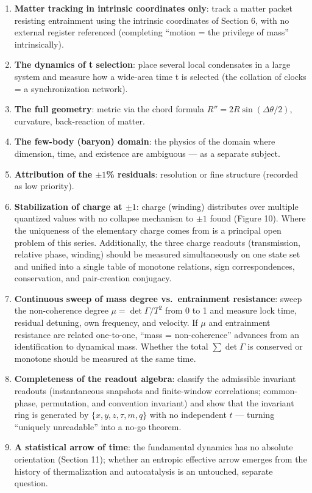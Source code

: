 \documentclass[
  a4paper,
]{article}
\providecommand{\tightlist}{%
  \setlength{\itemsep}{0pt}\setlength{\parskip}{0pt}}
\begin{document}
\begin{enumerate}
\def\labelenumi{\arabic{enumi}.}
\tightlist
\item
  \textbf{Matter tracking in intrinsic coordinates only}: track a matter
  packet resisting entrainment using the intrinsic coordinates of
  Section 6, with no external register referenced (completing ``motion =
  the privilege of mass'' intrinsically).
\item
  \textbf{The dynamics of t selection}: place several local condensates
  in a large system and measure how a wide-area time t is selected (the
  collation of clocks = a synchronization network).
\item
  \textbf{The full geometry}: metric via the chord formula
  \(R''=2R\sin(\Delta\theta/2)\), curvature, back-reaction of matter.
\item
  \textbf{The few-body (baryon) domain}: the physics of the domain where
  dimension, time, and existence are ambiguous --- as a separate
  subject.
\item
  \textbf{Attribution of the \(\pm 1\)\% residuals}: resolution or fine
  structure (recorded as low priority).
\item
  \textbf{Stabilization of charge at \(\pm 1\)}: charge (winding)
  distributes over multiple quantized values with no collapse mechanism
  to \(\pm 1\) found (Figure 10). Where the uniqueness of the elementary
  charge comes from is a principal open problem of this series.
  Additionally, the three charge readouts (transmission, relative phase,
  winding) should be measured simultaneously on one state set and
  unified into a single table of monotone relations, sign
  correspondences, conservation, and pair-creation conjugacy.
\item
  \textbf{Continuous sweep of mass degree vs.~entrainment resistance}:
  sweep the non-coherence degree \(\mu=\det\Gamma/T^2\) from 0 to 1 and
  measure lock time, residual detuning, own frequency, and velocity. If
  \(\mu\) and entrainment resistance are related one-to-one, ``mass =
  non-coherence'' advances from an identification to dynamical mass.
  Whether the total \(\sum \det\Gamma\) is conserved or monotone should
  be measured at the same time.
\item
  \textbf{Completeness of the readout algebra}: classify the admissible
  invariant readouts (instantaneous snapshots and finite-window
  correlations; common-phase, permutation, and convention invariant) and
  show that the invariant ring is generated by \(\{x,y,z,\tau,m,q\}\)
  with no independent \(t\) --- turning ``uniquely unreadable'' into a
  no-go theorem.
\item
  \textbf{A statistical arrow of time}: the fundamental dynamics has no
  absolute orientation (Section 11); whether an entropic effective arrow
  emerges from the history of thermalization and autocatalysis is an
  untouched, separate question.
\end{enumerate}
\end{document}
